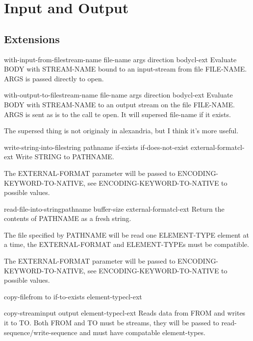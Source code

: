 \chapter{Input and Output}





\section{Extensions}
\label{sec:extensions}

\begin{macro}{with-input-from-file}{stream-name file-name \rest args
    \key direction \akeys \body body}{cl-ext}{}
  Evaluate BODY with STREAM-NAME bound to an input-stream from file
FILE-NAME. ARGS is passed directly to open.
\end{macro}

\begin{macro}{with-output-to-file}{stream-name file-name \rest args
    \key direction \akeys \body body}{cl-ext}{}
  Evaluate BODY with STREAM-NAME to an output stream on the file
FILE-NAME. ARGS is sent as is to the call te open. It will supersed
file-name if it exists.
\begin{devnote}
  The supersed thing is not originaly in alexandria, but I think it's
  more useful.
\end{devnote}
\end{macro}

\begin{function}{write-string-into-file}{string pathname \key if-exists if-does-not-exist external-format}{cl-ext}{}
  Write STRING to PATHNAME.

The EXTERNAL-FORMAT parameter will be passed to
ENCODING-KEYWORD-TO-NATIVE, see ENCODING-KEYWORD-TO-NATIVE to
possible values.
\end{function}

\begin{function}{read-file-into-string}{pathname \key buffer-size external-format}{cl-ext}{}
  Return the contents of PATHNAME as a fresh string.

The file specified by PATHNAME will be read one ELEMENT-TYPE
element at a time, the EXTERNAL-FORMAT and ELEMENT-TYPEs must be
compatible.

The EXTERNAL-FORMAT parameter will be passed to
ENCODING-KEYWORD-TO-NATIVE, see ENCODING-KEYWORD-TO-NATIVE to
possible values.
\end{function}

\begin{function}{copy-file}{from to \key if-to-exists element-type}{cl-ext}{}
  
\end{function}

\begin{function}{copy-stream}{input output \op element-type}{cl-ext}{}
  Reads data from FROM and writes it to TO. Both FROM and TO must be streams,
they will be passed to read-sequence/write-sequence and must have compatable
element-types.
\end{function}


